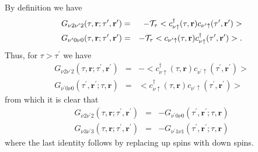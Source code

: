 By definition we have
\begin{eqnarray}
G_{\nu 2 \nu^{\prime}2}(\tau ,\mathbf{r}; \tau^{\prime},\mathbf{r}^{\prime})
& = & -{\cal T}_{\tau} <c^{\dagger}_{\nu\uparrow}(\tau,\mathbf{r})
c_{\nu^{\prime}\uparrow}(\tau^{\prime},\mathbf{r}^{\prime})> \\
G_{\nu^{\prime}0\nu 0}(\tau ,\mathbf{r}; \tau^{\prime},\mathbf{r}^{\prime})
& = & -{\cal T}_{\tau} <c_{\nu^{\prime}\uparrow}(\tau,\mathbf{r})
c^{\dagger}_{\nu\uparrow}(\tau^{\prime},\mathbf{r}^{\prime})>.
\end{eqnarray}
Thus, for $\tau > \tau^{\prime}$ we have
\begin{eqnarray}
G_{\nu 2 \nu^{\prime}2}(\tau ,\mathbf{r}; \tau^{\prime},\mathbf{r}^{\prime})
& = & -<c^{\dagger}_{\nu\uparrow}(\tau,\mathbf{r})
c_{\nu^{\prime}\uparrow}(\tau^{\prime},\mathbf{r}^{\prime})> \\
G_{\nu^{\prime}0 \nu 0}(\tau^{\prime},\mathbf{r}^{\prime};\tau ,\mathbf{r})
& = & <c^{\dagger}_{\nu \uparrow}(\tau,\mathbf{r})
c_{\nu^{\prime}\uparrow}(\tau^{\prime},\mathbf{r}^{\prime})>
\end{eqnarray}
from which it is clear that
\begin{eqnarray}
G_{\nu 2 \nu^{\prime}2}(\tau ,\mathbf{r}; \tau^{\prime},\mathbf{r}^{\prime}) & = &
- G_{\nu^{\prime}0\nu 0}(\tau^{\prime},\mathbf{r}^{\prime};\tau ,\mathbf{r}) \\
G_{\nu 3 \nu^{\prime}3}(\tau ,\mathbf{r}; \tau^{\prime},\mathbf{r}^{\prime}) & = &
- G_{\nu^{\prime}1\nu 1}(\tau^{\prime},\mathbf{r}^{\prime};\tau ,\mathbf{r})
\end{eqnarray}
where the last identity follows by replacing up spins with down spins.

